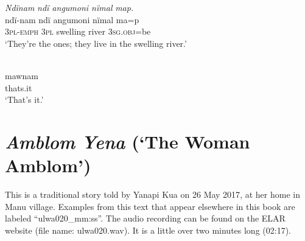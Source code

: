 \ex \negmedspace \textit{Ndïna}{\textit{m}} \textit{nd}{\textit{ï angumoni nïmal}} \textit{map.}\\
\gll ndï{{}-}na{m} ndï  angumoni  nïmal ma{=}p\\
3\textsc{pl-emph}  \textsc{3pl}  swelling  river  3\textsc{sg.obj}{=be}\\
\glt ‘They’re the ones; they live in the swelling river.’

\ex {}\\
\gll mawnam\\
thats.it\\
\glt ‘That’s it.’
\z

\section{\label{sec:16.2}  {\textit{Amblom} \textit{Yena}} {(‘The} {Woman} {Amblom’)}}

This is a traditional story told by Yanapi Kua on 26  {May 2017}, at her home in Manu village. Examples from this text that appear elsewhere in this book are labeled “ulwa020\_mm:ss”. The audio recording can be found on the ELAR website (file name: ulwa020.wav). It is a little over two minutes long (02:17).

